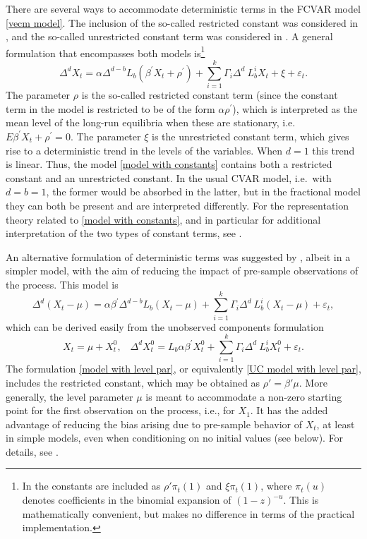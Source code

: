\documentclass[article]{jss}
\begin{document}
There are several ways to accommodate deterministic terms in the FCVAR model \eqref{vecm model}. The inclusion of the so-called restricted constant was considered in \cite{johansen2012likelihood}, and the so-called unrestricted constant term was considered in \cite{Dolatabadi2014}. A general formulation that encompasses both models is\footnote{In \cite{Dolatabadi2014} the constants are included as $\rho' \pi_t(1)$ and $\xi \pi_t(1)$, where $\pi_t(u)$ denotes coefficients in the binomial expansion of $(1-z)^{-u}$. This is mathematically convenient, but makes no difference in terms of the practical implementation.}
\begin{equation}
\Delta^{d}X_{t}= \alpha \Delta^{d-b} L_{b} (\beta^{\prime} X_{t} +\rho^{\prime}) + 
\sum_{i=1}^{k}\Gamma_{i}\Delta^{d}\ L_{b}^{i}X_{t} +\xi
+ \varepsilon_{t}.
\label{model with constants}
\end{equation}
The parameter $\rho $ is the so-called restricted constant term (since the constant term in the model is restricted to be of the form $\alpha \rho ^{\prime }$), which is interpreted as the mean level of the long-run equilibria when these are stationary, i.e.\ $E\beta ^{\prime }X_{t}+\rho ^{\prime }=0$. The parameter $\xi$ is the unrestricted constant term, which gives rise to a deterministic trend in the levels of the variables. When $d=1$ this trend is linear. Thus, the model \eqref{model with constants} contains both a restricted constant and an unrestricted constant. In the usual CVAR model, i.e.\ with $d=b=1$, the former would be absorbed in the latter, but in the fractional model they can both be present and are interpreted differently. For the representation theory related to \eqref{model with constants}, and in particular for additional interpretation of the two types of constant terms, see \cite{Dolatabadi2014}.

An alternative formulation of deterministic terms was suggested by \cite{johansen2014initial}, albeit in a simpler model, with the aim of reducing the impact of pre-sample observations of the process. This model is
\begin{equation}
\Delta^{d}(X_{t}-\mu)= \alpha \beta^{\prime} \Delta^{d-b} L_{b} (X_{t}-\mu) + 
\sum_{i=1}^{k}\Gamma_{i}\Delta^{d}\ L_{b}^{i}(X_{t}-\mu)
+ \varepsilon_{t},
\label{model with level par}
\end{equation}
which can be derived easily from the unobserved components formulation
\begin{equation}
X_t = \mu + X_t^0, \; \; \;
\Delta^{d}X_{t}^0=L_{b} \alpha \beta^{\prime} X_{t}^0 + 
\sum_{i=1}^{k}\Gamma_{i}\Delta^{d}\ L_{b}^{i}X_{t}^0
+ \varepsilon_{t}.
\label{UC model with level par}
\end{equation}
The formulation \eqref{model with level par}, or equivalently \eqref{UC model with level par}, includes the restricted constant, which may be obtained as $\rho'=\beta'\mu$. More generally, the level parameter $\mu$ is meant to accommodate a non-zero starting point for the first observation on the process, i.e., for $X_1$. It has the added advantage of reducing the bias arising due to pre-sample behavior of $X_t$, at least in simple models, even when conditioning on no initial values (see below). For details, see \cite{johansen2014initial}.
\end{document}
